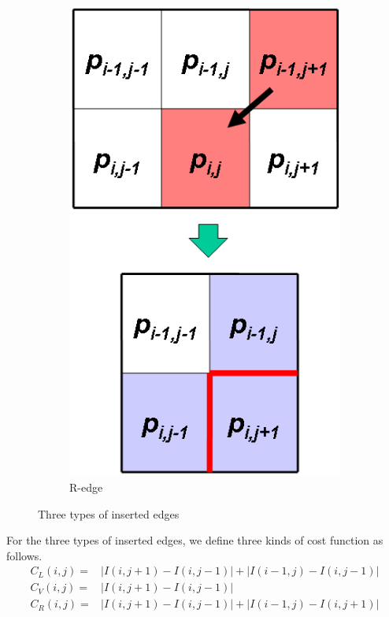 \documentclass[final]{cvpr}
\begin{document}
\begin{figure}[htb]
\begin{center}
\begin{subfigure}[b]{0.30\linewidth}
    \includegraphics[width=\textwidth]{edge2.png}
    \caption{R-edge}
\end{subfigure}
\end{center}
\caption{Three types of inserted edges}
\label{fig:inserted_edges}
\end{figure}
For the three types of inserted edges, we define three kinds of cost function as follows.
\begin{equation}
    \begin{aligned}
        C_L(i,j)=&|I(i,j+1)-I(i,j-1)|+|I(i-1,j)-I(i,j-1)|\\
        C_V(i,j)=&|I(i,j+1)-I(i,j-1)|\\
        C_R(i,j)=&|I(i,j+1)-I(i,j-1)|+|I(i-1,j)-I(i,j+1)|
        \label{eq:inserted_energy}
    \end{aligned}
\end{equation}
\end{document}
